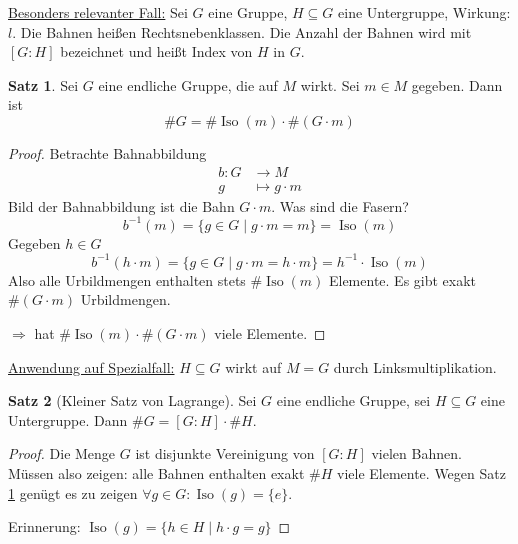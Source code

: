 \documentclass[12pt,parskip=full]{scrartcl}
\newcommand{\heading}{\underline}
\theoremstyle{definition}
\newtheorem{theorem}{Satz}[section]
\theoremstyle{remark}
\begin{document}
	\heading{Besonders relevanter Fall:} Sei $G$ eine Gruppe, $H \subseteq G$ eine Untergruppe, Wirkung: $l$. Die Bahnen heißen Rechtsnebenklassen. Die Anzahl der Bahnen wird mit $[G:H]$ bezeichnet und heißt Index von $H$ in $G$.
	
	\begin{theorem}
		\label{thm:4_4}
		Sei $G$ eine endliche Gruppe, die auf $M$ wirkt. Sei $m \in M$ gegeben. Dann ist
		\begin{equation*}
			\#G = \#\operatorname{Iso}(m) \cdot \#(G \cdot m)
		\end{equation*}
	\end{theorem}
	\begin{proof}
		Betrachte Bahnabbildung
		\begin{align*}
			b: G &\longrightarrow M \\
			g &\longmapsto g \cdot m
		\end{align*}
		Bild der Bahnabbildung ist die Bahn $G \cdot m$. Was sind die Fasern?
		\begin{equation*}
			b^{-1}(m) = \{ g \in G \mid g \cdot m = m \} = \operatorname{Iso}(m)
		\end{equation*}
		Gegeben $h \in G$
		\begin{equation*}
			b^{-1}(h \cdot m) = \{ g \in G \mid g \cdot m = h \cdot m \} = h^{-1} \cdot \operatorname{Iso}(m)
		\end{equation*}
		Also alle Urbildmengen enthalten stets $\#\operatorname{Iso}(m)$ Elemente. Es gibt exakt $\#(G \cdot m)$ Urbildmengen.
		
		$\Rightarrow$ hat $\#\operatorname{Iso}(m) \cdot \#(G \cdot m)$ viele Elemente.
	\end{proof}

	\heading{Anwendung auf Spezialfall:} $H \subseteq G$ wirkt auf $M = G$ durch Linksmultiplikation.
	
	\begin{theorem}[Kleiner Satz von Lagrange]
		Sei $G$ eine endliche Gruppe, sei $H \subseteq G$ eine Untergruppe. Dann $\#G = [G:H] \cdot \#H$.
	\end{theorem}

	\begin{proof}
		Die Menge $G$ ist disjunkte Vereinigung von $[G:H]$ vielen Bahnen. Müssen also zeigen: alle Bahnen enthalten exakt $\#H$ viele Elemente. Wegen Satz \ref{thm:4_4} genügt es zu zeigen $\forall g \in G: \operatorname{Iso}(g) = \{ e \}$.
		
		Erinnerung: $\operatorname{Iso}(g) = \{ h \in H \mid h \cdot g = g \}$
	\end{proof}
\end{document}
